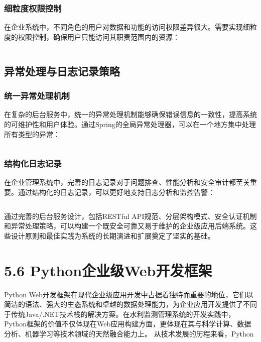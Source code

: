{{{{{{{{{{{{{{\subsubsection{细粒度权限控制}\label{ux7ec6ux7c92ux5ea6ux6743ux9650ux63a7ux5236}
在企业系统中，不同角色的用户对数据和功能的访问权限差异很大。需要实现细粒度的权限控制，确保用户只能访问其职责范围内的资源： \begin{lstlisting}[language=Java] \end{lstlisting}
\subsection{异常处理与日志记录策略}\label{ux5f02ux5e38ux5904ux7406ux4e0eux65e5ux5fd7ux8bb0ux5f55ux7b56ux7565}
\subsubsection{统一异常处理机制}\label{ux7edfux4e00ux5f02ux5e38ux5904ux7406ux673aux5236}
在复杂的后台服务中，统一的异常处理机制能够确保错误信息的一致性，提高系统的可维护性和用户体验。通过Spring的全局异常处理器，可以在一个地方集中处理所有类型的异常： \begin{lstlisting}[language=Java]
\end{lstlisting} \subsubsection{结构化日志记录}\label{ux7ed3ux6784ux5316ux65e5ux5fd7ux8bb0ux5f55}
在企业管理系统中，完善的日志记录对于问题排查、性能分析和安全审计都至关重要。通过结构化的日志记录，可以更好地支持日志分析和监控告警： \begin{lstlisting}[language=Java] \end{lstlisting}
通过完善的后台服务设计，包括RESTful API规范、分层架构模式、安全认证机制和异常处理策略，可以构建一个既安全可靠又易于维护的企业级应用后端系统。这些设计原则和最佳实践为系统的长期演进和扩展奠定了坚实的基础。 \section{5.6
Python企业级Web开发框架}\label{pythonux4f01ux4e1aux7ea7webux5f00ux53d1ux6846ux67b6} Python
Web开发框架在现代企业级应用开发中占据着独特而重要的地位，它们以简洁的语法、强大的生态系统和卓越的数据处理能力，为企业应用开发提供了不同于传统Java/.NET技术栈的解决方案。在水利监测管理系统的开发实践中，Python框架的价值不仅体现在Web应用构建方面，更体现在其与科学计算、数据分析、机器学习等技术领域的天然融合能力上。
从技术发展的历程来看，Python
}}}}}}}}}}}}}}
